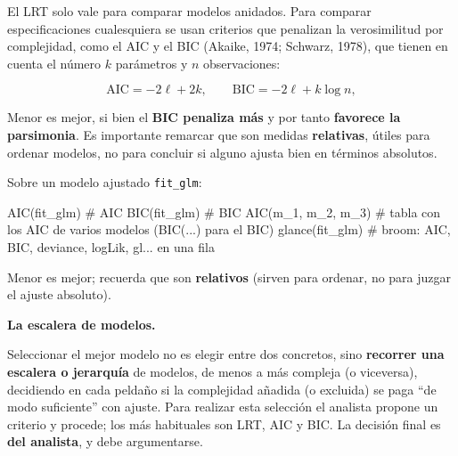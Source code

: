 \documentclass[
  letterpaper,
  DIV=11,
  numbers=noendperiod]{scrartcl}
\newenvironment{Shaded}{\begin{snugshade}}{\end{snugshade}}
\newcommand{\CommentTok}[1]{\textcolor[rgb]{0.37,0.37,0.37}{#1}}
\newcommand{\FunctionTok}[1]{\textcolor[rgb]{0.28,0.35,0.67}{#1}}
\newcommand{\NormalTok}[1]{\textcolor[rgb]{0.00,0.23,0.31}{#1}}
\begin{document}
El LRT solo vale para comparar modelos anidados. Para comparar
especificaciones cualesquiera se usan criterios que penalizan la
verosimilitud por complejidad, como el AIC y el BIC (Akaike, 1974;
Schwarz, 1978), que tienen en cuenta el número \(k\) parámetros y \(n\)
observaciones:

\[
\text{AIC}=-2\ell+2k,\qquad \text{BIC}=-2\ell+k\log n,
\]

Menor es mejor, si bien el \textbf{BIC penaliza más} y por tanto
\textbf{favorece la parsimonia}. Es importante remarcar que son medidas
\textbf{relativas}, útiles para ordenar modelos, no para concluir si
alguno ajusta bien en términos absolutos.

\begin{tcolorbox}[enhanced jigsaw, breakable, colframe=quarto-callout-tip-color-frame, left=2mm, arc=.35mm, colbacktitle=quarto-callout-tip-color!10!white, toprule=.15mm, colback=white, coltitle=black, rightrule=.15mm, opacitybacktitle=0.6, title=\textcolor{quarto-callout-tip-color}{\faLightbulb}\hspace{0.5em}{🔧 En R. AIC y BIC de un modelo}, titlerule=0mm, toptitle=1mm, bottomtitle=1mm, leftrule=.75mm, bottomrule=.15mm, opacityback=0]

Sobre un modelo ajustado \texttt{fit\_glm}:

\begin{Shaded}
\begin{Highlighting}[]
\FunctionTok{AIC}\NormalTok{(fit\_glm)              }\CommentTok{\# AIC}
\FunctionTok{BIC}\NormalTok{(fit\_glm)              }\CommentTok{\# BIC}
\FunctionTok{AIC}\NormalTok{(m\_1, m\_2, m\_3)        }\CommentTok{\# tabla con los AIC de varios modelos (BIC(...) para el BIC)}
\FunctionTok{glance}\NormalTok{(fit\_glm)           }\CommentTok{\# broom: AIC, BIC, deviance, logLik, gl... en una fila}
\end{Highlighting}
\end{Shaded}

Menor es mejor; recuerda que son \textbf{relativos} (sirven para
ordenar, no para juzgar el ajuste absoluto).

\end{tcolorbox}

\textbf{La escalera de modelos.}

Seleccionar el mejor modelo no es elegir entre dos concretos, sino
\textbf{recorrer una escalera o jerarquía} de modelos, de menos a más
compleja (o viceversa), decidiendo en cada peldaño si la complejidad
añadida (o excluida) se paga ``de modo suficiente'' con ajuste. Para
realizar esta selección el analista propone un criterio y procede; los
más habituales son LRT, AIC y BIC. La decisión final es \textbf{del
analista}, y debe argumentarse.
\end{document}
